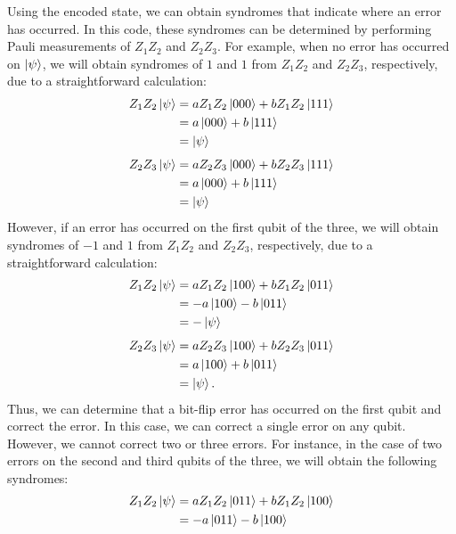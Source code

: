 \documentclass[a4paper,11pt]{ltjsarticle}
\begin{document}
{{{            Using the encoded state, we can obtain syndromes that indicate where an error has occurred. In this code, these syndromes can be determined by performing Pauli measurements of $Z_1 Z_2$ and $Z_2 Z_3$. For example, when no error has occurred on \(\ket{\psi}\), we will obtain syndromes of $1$ and $1$ from $Z_1 Z_2$ and $Z_2 Z_3$, respectively, due to a straightforward calculation:
            \begin{align*}
                Z_1Z_2\ket{\psi} &= aZ_1Z_2\ket{000}+bZ_1Z_2\ket{111}\\
                &= a\ket{000}+b\ket{111}\\
                &= \ket{\psi}
            \end{align*}
            \begin{align*}
                Z_2 Z_3\ket{\psi} &= aZ_2Z_3\ket{000}+bZ_2Z_3\ket{111}\\
                &= a\ket{000}+b\ket{111}\\
                &= \ket{\psi}
            \end{align*}
            However, if an error has occurred on the first qubit of the three, we will obtain syndromes of $-1$ and $1$ from $Z_1 Z_2$ and $Z_2 Z_3$, respectively, due to a straightforward calculation:
            \begin{align*}
                Z_1Z_2\ket{\psi} &= aZ_1Z_2\ket{100}+bZ_1Z_2\ket{011}\\
                &= -a\ket{100}-b\ket{011}\\
                &= -\ket{\psi}
            \end{align*}
            \begin{align*}
                Z_2 Z_3\ket{\psi} &= aZ_2Z_3\ket{100}+bZ_2Z_3\ket{011}\\
                &= a\ket{100}+b\ket{011}\\
                &= \ket{\psi}.
            \end{align*}
            Thus, we can determine that a bit-flip error has occurred on the first qubit and correct the error. In this case, we can correct a single error on any qubit. However, we cannot correct two or three errors. For instance, in the case of two errors on the second and third qubits of the three, we will obtain the following syndromes:
            \begin{align*}
                Z_1Z_2\ket{\psi} &= aZ_1Z_2\ket{011}+bZ_1Z_2\ket{100}\\
                &= -a\ket{011}-b\ket{100}\\

\end{align*}}}}
\end{document}
